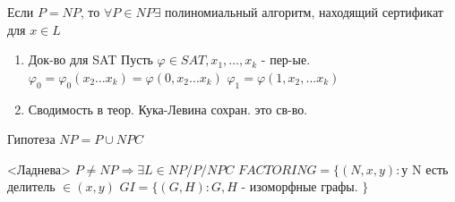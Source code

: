 	\begin{statement}
		 Если $P = NP$, то $\forall P \in NP \exists$ полиномиальный алгоритм, находящий сертификат для $x\in L$
		 \proof
		\begin{enumerate}
			\item Док-во для SAT
			Пусть $\varphi \in SAT, x_1,\ldots,x_k$ - пер-ые.
			$\varphi_0 = \varphi_0 (x_2\ldots x_k) = \varphi(0,x_2 \ldots x_k)$
			$\varphi_1 = \varphi(1,x_2,\ldots x_k)$
			
			\item Сводимость в теор. Кука-Левина сохран. это св-во.
		\end{enumerate}
	\end{statement}
	
	Гипотеза $NP = P \cup NPC$
	\begin{theorem}{<Ладнева>}
		$P \not = NP \Rightarrow \exists L \in NP/P/NPC$
		$FACTORING = \{(N,x,y) : $у N есть делитель $\in(x,y)$
		$GI = \{ (G,H) : G, H$ - изоморфные графы. $\}$
	\end{theorem}